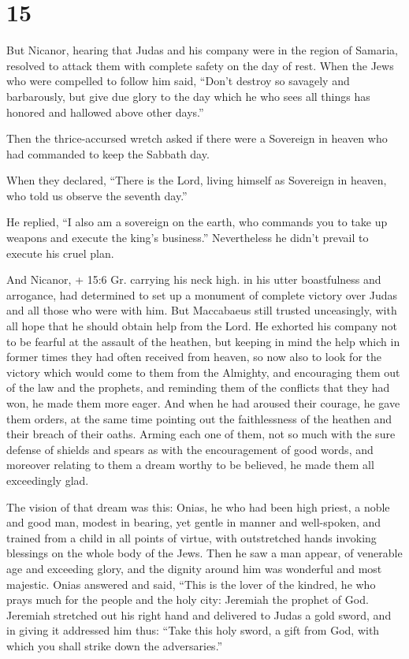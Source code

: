 \hypertarget{section-13}{%
\section{15}\label{section-13}}

 But Nicanor, hearing that Judas and his company were in the
region of Samaria, resolved to attack them with complete safety on the
day of rest.  When the Jews who were compelled to follow him
said, ``Don't destroy so savagely and barbarously, but give due glory to
the day which he who sees all things has honored and hallowed above
other days.''

 Then the thrice-accursed wretch asked if there were a
Sovereign in heaven who had commanded to keep the Sabbath day.

 When they declared, ``There is the Lord, living himself as
Sovereign in heaven, who told us observe the seventh day.''

 He replied, ``I also am a sovereign on the earth, who
commands you to take up weapons and execute the king's business.''
Nevertheless he didn't prevail to execute his cruel plan.

 And Nicanor, + 15:6 Gr. carrying his neck high. in his
utter boastfulness and arrogance, had determined to set up a monument of
complete victory over Judas and all those who were with him.
 But Maccabaeus still trusted unceasingly, with all hope
that he should obtain help from the Lord.  He exhorted his
company not to be fearful at the assault of the heathen, but keeping in
mind the help which in former times they had often received from heaven,
so now also to look for the victory which would come to them from the
Almighty,  and encouraging them out of the law and the
prophets, and reminding them of the conflicts that they had won, he made
them more eager.  And when he had aroused their courage, he
gave them orders, at the same time pointing out the faithlessness of the
heathen and their breach of their oaths.  Arming each one
of them, not so much with the sure defense of shields and spears as with
the encouragement of good words, and moreover relating to them a dream
worthy to be believed, he made them all exceedingly glad.

 The vision of that dream was this: Onias, he who had been
high priest, a noble and good man, modest in bearing, yet gentle in
manner and well-spoken, and trained from a child in all points of
virtue, with outstretched hands invoking blessings on the whole body of
the Jews.  Then he saw a man appear, of venerable age and
exceeding glory, and the dignity around him was wonderful and most
majestic.  Onias answered and said, ``This is the lover of
the kindred, he who prays much for the people and the holy city:
Jeremiah the prophet of God.  Jeremiah stretched out his
right hand and delivered to Judas a gold sword, and in giving it
addressed him thus:  ``Take this holy sword, a gift from
God, with which you shall strike down the adversaries.''

